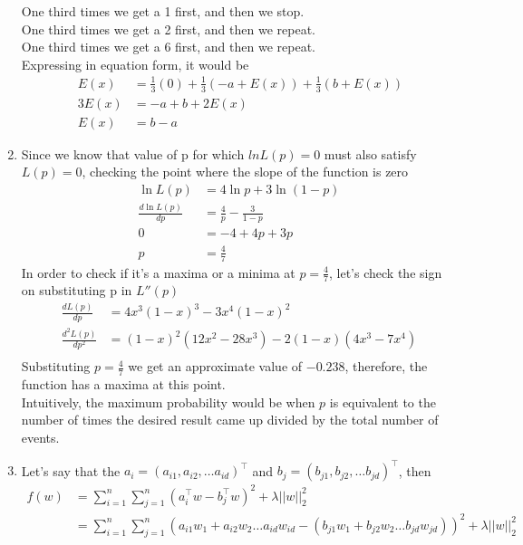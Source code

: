 \documentclass[12pt]{article}
\begin{document}
\begin{enumerate}[label=(\alph*)]
One third times we get a 1 first, and then we stop. \\
One third times we get a 2 first, and then we repeat. \\
One third times we get a 6 first, and then we repeat. \\
\linebreak
Expressing in equation form, it would be \\
\begin{equation*}\
\begin{split}
E(x) & = \frac{1}{3}(0) + \frac{1}{3}(-a + E(x)) + \frac{1}{3}(b + E(x)) \\
3 E(x) & = -a + b + 2E(x) \\
E(x) & = b-a
\end{split}
\end{equation*}
\linebreak
\item Since we know that value of p for which $ln L(p) = 0$ must also satisfy $L(p) = 0$, checking the point where the slope of the function is zero  \\
\begin{equation*}
\begin{split}
\ln L(p) & = 4\ln p + 3\ln (1-p)\\
\frac{d \ln L(p)}{d p} & = \frac{4}{p} - \frac{3}{1-p}\\
0 & = - 4 + 4p + 3p\\
p & = \frac{4}{7}
\end{split}
\end{equation*}
In order to check if it's a maxima or a minima at $ p = \frac{4}{7}$, let's check the sign on substituting p in $L''(p)$ \\
\begin{equation*}
\begin{split}
\frac{d L(p)}{d p} & = 4x^3(1-x)^3 - 3x^4(1-x)^2 \\
\frac{d^2 L(p)}{d p^2} & = (1-x)^2(12x^2 - 28x^3) - 2(1-x)(4x^3 - 7x^4) \\
\end{split}
\end{equation*}
Substituting $p= \frac{4}{7}$ we get an approximate value of $-0.238$, therefore, the function has a maxima at this point.\\
Intuitively, the maximum probability would be when $p$ is equivalent to the number of times the desired result came up divided by the total number of events. \\
\linebreak
\item Let's say that the $a_i = (a_{i1}, a_{i2}, \dots a_{id})^\top$ and $b_j = (b_{j1}, b_{j2}, \dots b_{jd})^\top$, then
\begin{align*}
f(w) & = \sum_{i=1}^{n}\sum_{j=1}^{n} (a_i^\top w - b_j^\top w)^2 + \lambda||w||_2^2 \\
& = \sum_{i=1}^{n}\sum_{j=1}^{n} (a_{i1}w_1 + a_{i2}w_2 \dots a_{id}w_{id} - (b_{j1}w_1 + b_{j2}w_2 \dots b_{jd}w_{jd}))^2 + \lambda||w||_2^2
\end{align*}


\end{enumerate}
\end{document}
